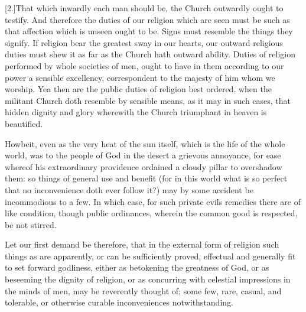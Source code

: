 [2.]That which inwardly each man should be, the Church outwardly ought to testify. And therefore the duties of our religion which are seen must be such as that affection which is unseen ought to be. Signs must resemble the things they signify. If religion bear the greatest sway in our hearts, our outward religious duties must shew it as far as the Church hath outward ability. Duties of religion performed by whole societies of men, ought to have in them according to our power a sensible excellency, correspondent to the majesty of him whom we worship. Yea then are the public duties of religion best ordered, when the militant Church doth resemble by sensible means, as it may in such cases, that hidden  dignity and glory wherewith the Church triumphant in heaven is beautified.

Howbeit, even as the very heat of the sun itself, which is the life of the whole world, was to the people of God in the desert a grievous annoyance, for ease whereof his extraordinary providence ordained a cloudy pillar to overshadow them: so things of general use and benefit (for in this world what is so perfect that no inconvenience doth ever follow it?) may by some accident be incommodious to a few. In which case, for such private evils remedies there are of like condition, though public ordinances, wherein the common good is respected, be not stirred.

Let our first demand be therefore, that in the external form of religion such things as are apparently, or can be sufficiently proved, effectual and generally fit to set forward godliness, either as betokening the greatness of God, or as beseeming the dignity of religion, or as concurring with celestial impressions in the minds of men, may be reverently thought of; some few, rare, casual, and tolerable, or otherwise curable inconveniences notwithstanding.


